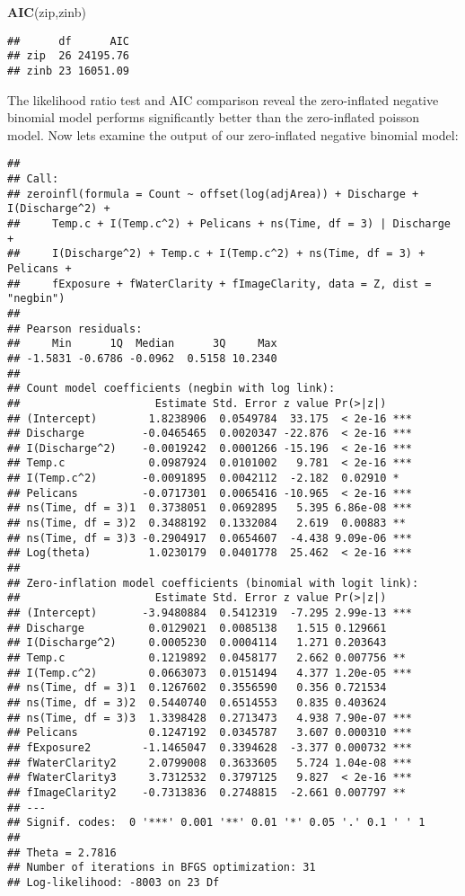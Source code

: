 \documentclass[]{article}
\newenvironment{Shaded}{\begin{snugshade}}{\end{snugshade}}
\newcommand{\KeywordTok}[1]{\textcolor[rgb]{0.13,0.29,0.53}{\textbf{{#1}}}}
\newcommand{\NormalTok}[1]{{#1}}
\begin{document}
\begin{Shaded}
\begin{Highlighting}[]
\KeywordTok{AIC}\NormalTok{(zip,zinb)}
\end{Highlighting}
\end{Shaded}

\begin{verbatim}
##      df      AIC
## zip  26 24195.76
## zinb 23 16051.09
\end{verbatim}

The likelihood ratio test and AIC comparison reveal the zero-inflated
negative binomial model performs significantly better than the
zero-inflated poisson model. Now lets examine the output of our
zero-inflated negative binomial model:

\begin{verbatim}
## 
## Call:
## zeroinfl(formula = Count ~ offset(log(adjArea)) + Discharge + I(Discharge^2) + 
##     Temp.c + I(Temp.c^2) + Pelicans + ns(Time, df = 3) | Discharge + 
##     I(Discharge^2) + Temp.c + I(Temp.c^2) + ns(Time, df = 3) + Pelicans + 
##     fExposure + fWaterClarity + fImageClarity, data = Z, dist = "negbin")
## 
## Pearson residuals:
##     Min      1Q  Median      3Q     Max 
## -1.5831 -0.6786 -0.0962  0.5158 10.2340 
## 
## Count model coefficients (negbin with log link):
##                     Estimate Std. Error z value Pr(>|z|)    
## (Intercept)        1.8238906  0.0549784  33.175  < 2e-16 ***
## Discharge         -0.0465465  0.0020347 -22.876  < 2e-16 ***
## I(Discharge^2)    -0.0019242  0.0001266 -15.196  < 2e-16 ***
## Temp.c             0.0987924  0.0101002   9.781  < 2e-16 ***
## I(Temp.c^2)       -0.0091895  0.0042112  -2.182  0.02910 *  
## Pelicans          -0.0717301  0.0065416 -10.965  < 2e-16 ***
## ns(Time, df = 3)1  0.3738051  0.0692895   5.395 6.86e-08 ***
## ns(Time, df = 3)2  0.3488192  0.1332084   2.619  0.00883 ** 
## ns(Time, df = 3)3 -0.2904917  0.0654607  -4.438 9.09e-06 ***
## Log(theta)         1.0230179  0.0401778  25.462  < 2e-16 ***
## 
## Zero-inflation model coefficients (binomial with logit link):
##                     Estimate Std. Error z value Pr(>|z|)    
## (Intercept)       -3.9480884  0.5412319  -7.295 2.99e-13 ***
## Discharge          0.0129021  0.0085138   1.515 0.129661    
## I(Discharge^2)     0.0005230  0.0004114   1.271 0.203643    
## Temp.c             0.1219892  0.0458177   2.662 0.007756 ** 
## I(Temp.c^2)        0.0663073  0.0151494   4.377 1.20e-05 ***
## ns(Time, df = 3)1  0.1267602  0.3556590   0.356 0.721534    
## ns(Time, df = 3)2  0.5440740  0.6514553   0.835 0.403624    
## ns(Time, df = 3)3  1.3398428  0.2713473   4.938 7.90e-07 ***
## Pelicans           0.1247192  0.0345787   3.607 0.000310 ***
## fExposure2        -1.1465047  0.3394628  -3.377 0.000732 ***
## fWaterClarity2     2.0799008  0.3633605   5.724 1.04e-08 ***
## fWaterClarity3     3.7312532  0.3797125   9.827  < 2e-16 ***
## fImageClarity2    -0.7313836  0.2748815  -2.661 0.007797 ** 
## ---
## Signif. codes:  0 '***' 0.001 '**' 0.01 '*' 0.05 '.' 0.1 ' ' 1 
## 
## Theta = 2.7816 
## Number of iterations in BFGS optimization: 31 
## Log-likelihood: -8003 on 23 Df
\end{verbatim}
\end{document}
